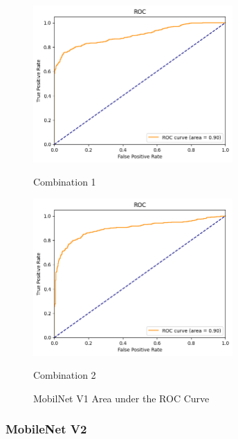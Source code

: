 \begin{figure}[H]
    \centering
    \begin{minipage}[b]{0.49\textwidth}
        \centering
        \includegraphics[width=\textwidth, height=6cm]{Figures/balanced_data/less_data/withoutbn/mn1/roc.png}
        \captionsetup{labelformat=empty}
        \caption{Combination 1}
        \label{fig:u_wo_r_roc}
    \end{minipage}
    \hfill
    \begin{minipage}[b]{0.49\textwidth}
        \centering
        \includegraphics[width=\textwidth, height=6cm]{Figures/balanced_data/less_data/withbn/mn1/roc.png}
        \captionsetup{labelformat=empty}
        \caption{Combination 2}
        \label{fig:u_w_r_roc}
    \end{minipage}
    \captionsetup{labelformat=default}
    \caption{MobilNet V1 Area under the ROC Curve}
\end{figure}

\subsubsection{MobileNet V2}

